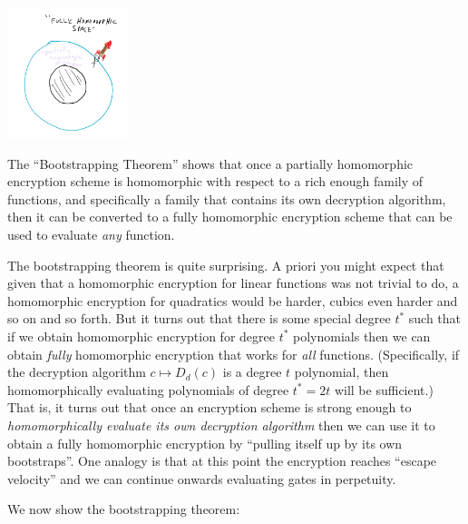 \begin{marginfigure}
\centering
\includegraphics[width=\linewidth, height=1.5in, keepaspectratio]{../figure/fheescape.png}
\caption{The ``Bootstrapping Theorem'' shows that once a partially
homomorphic encryption scheme is homomorphic with respect to a rich
enough family of functions, and specifically a family that contains its
own decryption algorithm, then it can be converted to a fully
homomorphic encryption scheme that can be used to evaluate \emph{any}
function.}
\label{bootstrapfig}
\end{marginfigure}

The bootstrapping theorem is quite surprising. A priori you might expect
that given that a homomorphic encryption for linear functions was not
trivial to do, a homomorphic encryption for quadratics would be harder,
cubics even harder and so on and so forth. But it turns out that there
is some special degree \(t^*\) such that if we obtain homomorphic
encryption for degree \(t^*\) polynomials then we can obtain
\emph{fully} homomorphic encryption that works for \emph{all} functions.
(Specifically, if the decryption algorithm \(c \mapsto D_d(c)\) is a
degree \(t\) polynomial, then homomorphically evaluating polynomials of
degree \(t^*=2t\) will be sufficient.) That is, it turns out that once
an encryption scheme is strong enough to \emph{homomorphically evaluate
its own decryption algorithm} then we can use it to obtain a fully
homomorphic encryption by ``pulling itself up by its own bootstraps''.
One analogy is that at this point the encryption reaches ``escape
velocity'' and we can continue onwards evaluating gates in perpetuity.

We now show the bootstrapping theorem:

\hypertarget{bootstrapthm}{}

